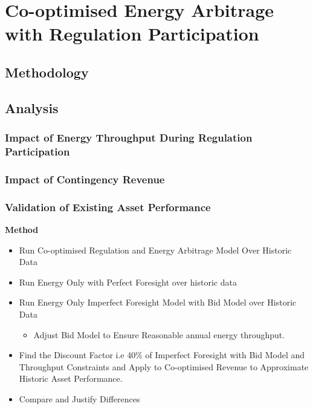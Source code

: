 \chapter{Co-optimised Energy Arbitrage with Regulation Participation}
\section{ Methodology }
\section{ Analysis }
\subsection{  Impact of Energy Throughput During Regulation Participation }
\subsection{ Impact of  Contingency Revenue }
\subsection{ Validation of Existing Asset Performance  }
\textbf{Method}
\begin{itemize}
  \item Run Co-optimised Regulation and Energy Arbitrage Model Over Historic Data
  \item Run Energy Only with Perfect Foresight over historic data
  \item Run Energy Only Imperfect Foresight Model with Bid Model over Historic Data
     \begin{itemize}
     \item Adjust Bid Model to Ensure Reasonable annual energy throughput. 
   \end{itemize}
  \item Find the Discount Factor i.e 40\% of Imperfect Foresight with Bid Model and Throughput Constraints and Apply to Co-optimised Revenue to Approximate Historic Asset Performance. 
  \item Compare and Justify Differences
\end{itemize}